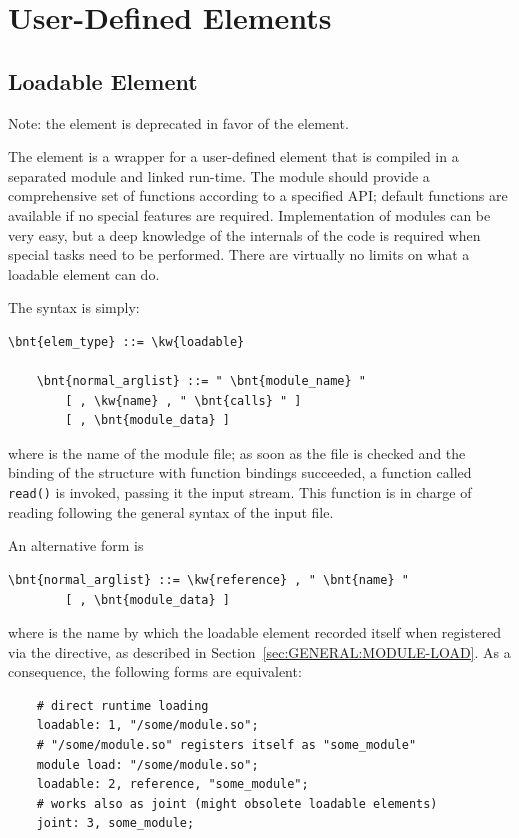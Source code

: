 


\section{User-Defined Elements}\label{sec:EL:BASE:USER_DEFINED}

\subsection{Loadable Element}\label{sec:EL:BASE:USER_DEFINED:LOADABLE}
Note: the  element is deprecated in favor
of the  element.

The  element is a wrapper for a user-defined element that is
compiled in a separated module and linked run-time.
The module should provide a comprehensive set of functions according to 
a specified API; default functions are available if no special features
are required.
Implementation of modules can be very easy, but a deep knowledge of the
internals of the code is required when special tasks need to be performed. 
There are virtually no limits on what a loadable element can do.

The syntax is simply:
\begin{Verbatim}[commandchars=\\\{\}]
    \bnt{elem_type} ::= \kw{loadable}

    \bnt{normal_arglist} ::= " \bnt{module_name} "
        [ , \kw{name} , " \bnt{calls} " ] 
        [ , \bnt{module_data} ]
\end{Verbatim}
where  is the name of the module file; as soon as the file
is checked and the binding of the structure with function bindings 
succeeded, a function called \texttt{read()} is invoked, passing it the input
stream.
This function is in charge of reading  following the
general syntax of the input file.

An alternative form is
\begin{Verbatim}[commandchars=\\\{\}]
    \bnt{normal_arglist} ::= \kw{reference} , " \bnt{name} "
        [ , \bnt{module_data} ]
\end{Verbatim}
where  is the name by which the loadable element recorded itself
when registered via the  directive, as described
in Section~\ref{sec:GENERAL:MODULE-LOAD}.
As a consequence, the following forms are equivalent:
\begin{verbatim}
    # direct runtime loading
    loadable: 1, "/some/module.so";
    # "/some/module.so" registers itself as "some_module"
    module load: "/some/module.so";
    loadable: 2, reference, "some_module";
    # works also as joint (might obsolete loadable elements)
    joint: 3, some_module;
\end{verbatim}

